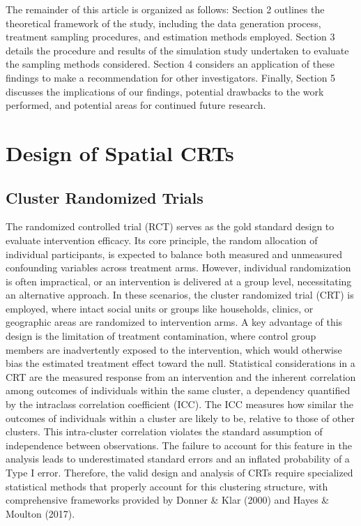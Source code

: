 \documentclass{article}[11pt]
\begin{document}
The remainder of this article is organized as follows: Section 2 outlines the theoretical framework of the study, including the data generation process, treatment sampling procedures, and estimation methods employed. Section 3 details the procedure and results of the simulation study undertaken to evaluate the sampling methods considered. Section 4 considers an application of these findings to make a recommendation for other investigators. Finally, Section 5 discusses the implications of our findings, potential drawbacks to the work performed, and potential areas for continued future research.

\section{Design of Spatial CRTs}

\subsection{Cluster Randomized Trials}

The randomized controlled trial (RCT) serves as the gold standard design to evaluate intervention efficacy\cite{kim_handbook_2021}. Its core principle, the random allocation of individual participants, is expected to balance both measured and unmeasured confounding variables across treatment arms\cite{matthews_introduction_2006}. However, individual randomization is often impractical, or an intervention is delivered at a group level, necessitating an alternative approach\cite{donner_design_2000}\cite{hayes_cluster_2017}. In these scenarios, the cluster randomized trial (CRT) is employed, where intact social units or groups like households, clinics, or geographic areas are randomized to intervention arms\cite{donner_design_2000}\cite{murray_design_1998}. A key advantage of this design is the limitation of treatment contamination, where control group members are inadvertently exposed to the intervention, which would otherwise bias the estimated treatment effect toward the null\cite{hayes_cluster_2017}. Statistical considerations in a CRT are the measured response from an intervention and the inherent correlation among outcomes of individuals within the same cluster, a dependency quantified by the intraclass correlation coefficient (ICC)\cite{donner_design_2000}\cite{hemming_how_2017}. The ICC measures how similar the outcomes of individuals within a cluster are likely to be, relative to those of other clusters. This intra-cluster correlation violates the standard assumption of independence between observations. The failure to account for this feature in the analysis leads to underestimated standard errors and an inflated probability of a Type I error\cite{campbell_how_2014}\cite{ntani_consequences_2021}. Therefore, the valid design and analysis of CRTs require specialized statistical methods that properly account for this clustering structure, with comprehensive frameworks provided by Donner \& Klar (2000)\cite{donner_design_2000} and Hayes \& Moulton (2017)\cite{hayes_cluster_2017}.
\end{document}
